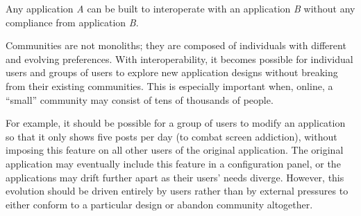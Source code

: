 





\begin{requirement}
\label{requirements:adversarial-interop}
Any application \emph{A} can be built to interoperate with an application \emph{B} without any compliance from application \emph{B}.
\end{requirement}

Communities are not monoliths; they are composed of individuals
with different and evolving preferences.
With interoperability, it becomes possible for individual users and groups of users to explore new application designs
without breaking from their existing communities.
This is especially important when, online, a ``small''
community may consist of tens of thousands of people.

For example, it should be possible for a group of users to
modify an application so that it only shows five posts per day (to combat screen addiction),
without imposing this feature on all other users of the original application.
The original application may eventually include this feature in a configuration panel,
or the applications may drift further apart as their users' needs diverge. However, this
evolution should be driven entirely by users rather than by external pressures
to either conform to a particular design or abandon community altogether.

